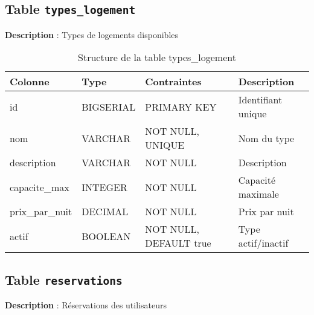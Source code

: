 \documentclass[12pt,a4paper]{article}
\begin{document}
\subsection{Table \texttt{types\_logement}}
\textbf{Description} : Types de logements disponibles

\begin{table}[h]
\centering
\begin{tabular}{|l|l|l|p{6cm}|}
\hline
\textbf{Colonne} & \textbf{Type} & \textbf{Contraintes} & \textbf{Description} \\
\hline
id & BIGSERIAL & PRIMARY KEY & Identifiant unique \\
\hline
nom & VARCHAR & NOT NULL, UNIQUE & Nom du type \\
\hline
description & VARCHAR & NOT NULL & Description \\
\hline
capacite\_max & INTEGER & NOT NULL & Capacité maximale \\
\hline
prix\_par\_nuit & DECIMAL & NOT NULL & Prix par nuit \\
\hline
actif & BOOLEAN & NOT NULL, DEFAULT true & Type actif/inactif \\
\hline
\end{tabular}
\caption{Structure de la table types\_logement}
\end{table}

\subsection{Table \texttt{reservations}}
\textbf{Description} : Réservations des utilisateurs
\end{document}
